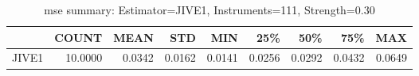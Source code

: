 \begin{table}[ht]
\centering
\caption{mse summary: Estimator=JIVE1, Instruments=111, Strength=0.30}
\begin{tabular}{lrrrrrrrr}
\toprule
 & COUNT & MEAN & STD & MIN & 25\% & 50\% & 75\% & MAX \\
\midrule
JIVE1 & 10.0000 & 0.0342 & 0.0162 & 0.0141 & 0.0256 & 0.0292 & 0.0432 & 0.0649 \\
\bottomrule
\end{tabular}
\end{table}
